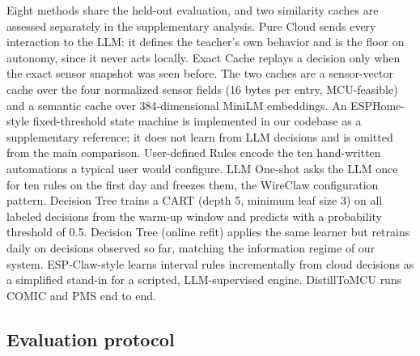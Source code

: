 \documentclass[11pt,a4paper]{article}
\begin{document}
Eight methods share the held-out evaluation, and two similarity caches are
assessed separately in the supplementary analysis. Pure Cloud sends every
interaction to the LLM: it defines the teacher's own behavior and is the floor
on autonomy, since it never acts locally.
Exact Cache replays a decision only when the exact sensor snapshot was seen
before. The two caches are a sensor-vector cache over the four normalized
sensor fields (16 bytes per entry, MCU-feasible) and a semantic cache over
384-dimensional MiniLM embeddings. An ESPHome-style fixed-threshold state
machine is implemented in our codebase as a supplementary reference; it does
not learn from LLM decisions and is omitted from the main comparison.
User-defined Rules encode the ten hand-written automations a
typical user would configure. LLM One-shot asks the LLM once for ten
rules on the first day and freezes them, the WireClaw configuration pattern.
Decision Tree trains a CART (depth 5, minimum leaf size 3) on all labeled
decisions from the warm-up window and predicts with a probability threshold
of 0.5. Decision Tree (online refit) applies the same learner but retrains
daily on decisions observed so far, matching the information regime of our
system. ESP-Claw-style learns interval rules incrementally from cloud
decisions as a simplified stand-in for a scripted, LLM-supervised engine.
DistillToMCU runs COMIC and PMS end to end.

\subsection{Evaluation protocol}
\end{document}
